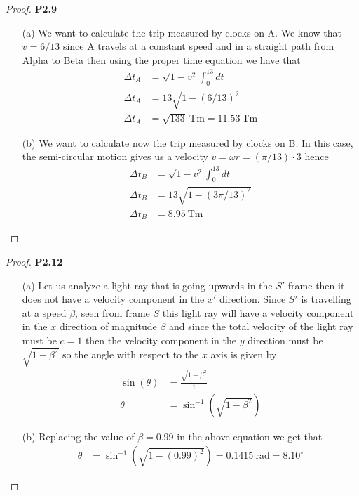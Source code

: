 \documentclass[11pt]{article}
\theoremstyle{definition}
\begin{document}
\begin{proof}{\textbf{P2.9}}
\begin{itemize}
    \item [(a)] We want to calculate the trip measured by clocks on A.
    We know that $v = 6/13$ since A travels
    at a constant speed and in a straight path from Alpha to Beta then
    using the proper time equation we have that
    \begin{align*}
        \Delta t_A &= \sqrt{1 - v^2}\int_0^{13} dt\\
        \Delta t_A &= 13 \sqrt{1 - (6/13)^2}\\ 
        \Delta t_A &= \sqrt{133}~\text{Tm} = 11.53~\text{Tm} 
    \end{align*}
    \item [(b)] We want to calculate now the trip measured by clocks on B.
    In this case, the semi-circular motion gives us a velocity
    $v = \omega r = (\pi/13)\cdot 3$ hence
    \begin{align*}
        \Delta t_B &= \sqrt{1 - v^2}\int_0^{13} dt\\
        \Delta t_B &= 13 \sqrt{1 - (3\pi/13)^2}\\
        \Delta t_B &= 8.95~\text{Tm} 
    \end{align*}
\end{itemize}
\end{proof}
\cleardoublepage
\begin{proof}{\textbf{P2.12}}
\begin{itemize}
    \item [(a)] Let us analyze a light ray that is going upwards in the $S'$
    frame then it does not have a velocity component in the $x'$ direction.
    Since $S'$ is travelling at a speed $\beta$, seen from frame $S$ this
    light ray will have a velocity component in the $x$ direction of magnitude
    $\beta$ and since the total velocity of the light ray must be $c = 1$
    then the velocity component in the $y$ direction must be
    $\sqrt{1 - \beta^2}$ so the angle with respect to the $x$ axis is given by
    \begin{align*}
        \sin(\theta) &= \frac{\sqrt{1 - \beta^2}}{1}\\
        \theta &= \sin^{-1}(\sqrt{1 - \beta^2})
    \end{align*}

    \item [(b)] Replacing the value of $\beta = 0.99$ in the above equation
    we get that
    \begin{align*}
        \theta &= \sin^{-1}(\sqrt{1 - (0.99)^2}) = 0.1415~\text{rad} = 8.10^\circ
    \end{align*}


\end{itemize}
\end{proof}
\end{document}
